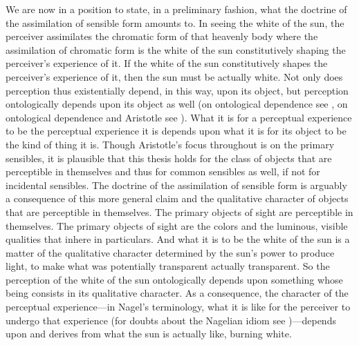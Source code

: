 We are now in a position to state, in a preliminary fashion, what the doctrine of the assimilation of sensible form amounts to. In seeing the white of the sun, the perceiver assimilates the chromatic form of that heavenly body where the assimilation of chromatic form is the white of the sun constitutively shaping the perceiver's experience of it. If the white of the sun constitutively shapes the perceiver's experience of it, then the sun must be actually white. Not only does perception thus existentially depend, in this way, upon its object, but perception ontologically depends upon its object as well (on ontological dependence see \citealt{Fine:1995ls}, on ontological dependence and Aristotle see \citealt{Peramatzis:2011aa}). What it is for a perceptual experience to be the perceptual experience it is depends upon what it is for its object to be the kind of thing it is. Though Aristotle's focus throughout is on the primary sensibles, it is plausible that this thesis holds for the class of objects that are perceptible in themselves and thus for common sensibles as well, if not for incidental sensibles. The doctrine of the assimilation of sensible form is arguably a consequence of this more general claim and the qualitative character of objects that are perceptible in themselves. The primary objects of sight are perceptible in themselves. The primary objects of sight are the colors and the luminous, visible qualities that inhere in particulars. And what it is to be the white of the sun is a matter of the qualitative character determined by the sun's power to produce light, to make what was potentially transparent actually transparent. So the perception of the white of the sun ontologically depends upon something whose being consists in its qualitative character.  As a consequence, the character of the perceptual experience---in Nagel's \citeyearpar{Nagel:1979fk} terminology, what it is like for the perceiver to undergo that experience (for doubts about the Nagelian idiom see \citealt{Snowdon:2010ap})---depends upon and derives from what the sun is actually like, burning white. 

